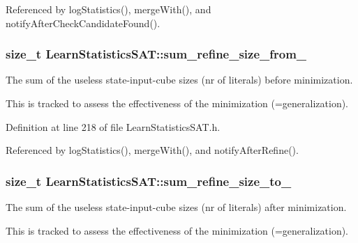 Referenced by log\-Statistics(), merge\-With(), and notify\-After\-Check\-Candidate\-Found().

\hypertarget{classLearnStatisticsSAT_a7f36ead437ee4833c96342d812551cce}{
\subsubsection[{sum\-\_\-refine\-\_\-size\-\_\-from\-\_\-}]{\setlength{\rightskip}{0pt plus 5cm}size\-\_\-t Learn\-Statistics\-S\-A\-T\-::sum\-\_\-refine\-\_\-size\-\_\-from\-\_\-\hspace{0.3cm}{\ttfamily [protected]}}}\label{classLearnStatisticsSAT_a7f36ead437ee4833c96342d812551cce}


The sum of the useless state-\/input-\/cube sizes (nr of literals) before minimization. 

This is tracked to assess the effectiveness of the minimization (=generalization). 

Definition at line 218 of file Learn\-Statistics\-S\-A\-T.\-h.



Referenced by log\-Statistics(), merge\-With(), and notify\-After\-Refine().

\hypertarget{classLearnStatisticsSAT_ab64cce193c819cdd5c3a6838d99eb0a7}{
\subsubsection[{sum\-\_\-refine\-\_\-size\-\_\-to\-\_\-}]{\setlength{\rightskip}{0pt plus 5cm}size\-\_\-t Learn\-Statistics\-S\-A\-T\-::sum\-\_\-refine\-\_\-size\-\_\-to\-\_\-\hspace{0.3cm}{\ttfamily [protected]}}}\label{classLearnStatisticsSAT_ab64cce193c819cdd5c3a6838d99eb0a7}


The sum of the useless state-\/input-\/cube sizes (nr of literals) after minimization. 

This is tracked to assess the effectiveness of the minimization (=generalization). 


